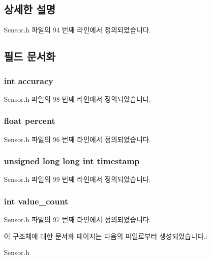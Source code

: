 \subsection{상세한 설명}


Sensor.\-h 파일의 94 번째 라인에서 정의되었습니다.



\subsection{필드 문서화}
\hypertarget{struct__Humidity__data_a5565cf9073275f9713f9016e7c10d25f}{
\subsubsection[{accuracy}]{\setlength{\rightskip}{0pt plus 5cm}int accuracy}}\label{struct__Humidity__data_a5565cf9073275f9713f9016e7c10d25f}


Sensor.\-h 파일의 98 번째 라인에서 정의되었습니다.

\hypertarget{struct__Humidity__data_aac167f3972a2f244f4b32c8ee5b89364}{
\subsubsection[{percent}]{\setlength{\rightskip}{0pt plus 5cm}float percent}}\label{struct__Humidity__data_aac167f3972a2f244f4b32c8ee5b89364}


Sensor.\-h 파일의 96 번째 라인에서 정의되었습니다.

\hypertarget{struct__Humidity__data_a8de02c4128636a7bf630ff5428f60c8d}{
\subsubsection[{timestamp}]{\setlength{\rightskip}{0pt plus 5cm}unsigned long long int timestamp}}\label{struct__Humidity__data_a8de02c4128636a7bf630ff5428f60c8d}


Sensor.\-h 파일의 99 번째 라인에서 정의되었습니다.

\hypertarget{struct__Humidity__data_a40a079bfc72408819dc78da308203a74}{
\subsubsection[{value\-\_\-count}]{\setlength{\rightskip}{0pt plus 5cm}int value\-\_\-count}}\label{struct__Humidity__data_a40a079bfc72408819dc78da308203a74}


Sensor.\-h 파일의 97 번째 라인에서 정의되었습니다.



이 구조체에 대한 문서화 페이지는 다음의 파일로부터 생성되었습니다.\-:\begin{DoxyCompactItemize}
\item 
Sensor.\-h\end{DoxyCompactItemize}
